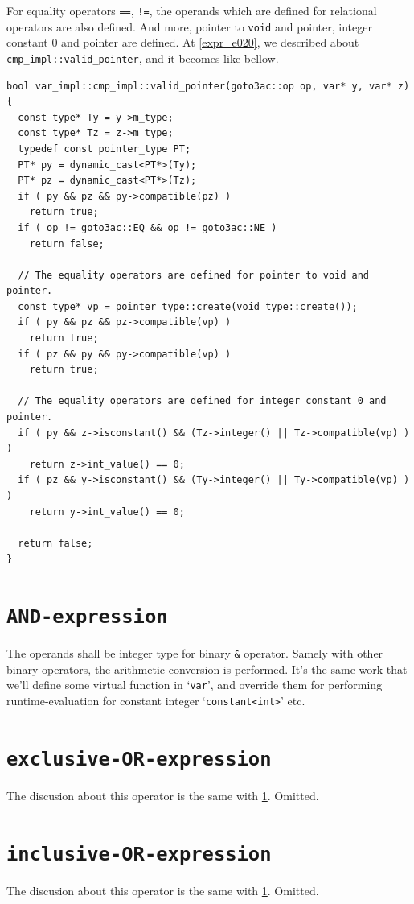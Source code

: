 For equality operators {\tt{==}}, {\tt{!=}}, 
the operands which are defined for relational operators
are also defined. And more,
pointer to {\tt{void}} and pointer,
integer constant 0 and pointer are defined.
At \ref{expr_e020}, we described
about {\tt{cmp\_impl::valid\_pointer}},
and it becomes like bellow.
\begin{verbatim}
bool var_impl::cmp_impl::valid_pointer(goto3ac::op op, var* y, var* z)
{
  const type* Ty = y->m_type;
  const type* Tz = z->m_type;
  typedef const pointer_type PT;
  PT* py = dynamic_cast<PT*>(Ty);
  PT* pz = dynamic_cast<PT*>(Tz);
  if ( py && pz && py->compatible(pz) )
    return true;
  if ( op != goto3ac::EQ && op != goto3ac::NE )
    return false;

  // The equality operators are defined for pointer to void and pointer.
  const type* vp = pointer_type::create(void_type::create());
  if ( py && pz && pz->compatible(vp) )
    return true;
  if ( pz && py && py->compatible(vp) )
    return true;

  // The equality operators are defined for integer constant 0 and pointer.
  if ( py && z->isconstant() && (Tz->integer() || Tz->compatible(vp) ) )
    return z->int_value() == 0;
  if ( pz && y->isconstant() && (Ty->integer() || Ty->compatible(vp) ) )
    return y->int_value() == 0;

  return false;
}
\end{verbatim}

\section{\tt{AND-expression}}
\label{expr_e021}
The operands shall be integer type for binary {\tt{\&}} operator.
Samely with other binary operators, the arithmetic conversion is
performed. It's the same work that we'll define some virtual function
in `{\tt{var}}', and override them for performing runtime-evaluation
for constant integer `{\tt{constant<int>}}' etc.

\section{\tt{exclusive-OR-expression}}
The discusion about this operator is the same with \ref{expr_e021}.
Omitted.

\section{\tt{inclusive-OR-expression}}
The discusion about this operator is the same with \ref{expr_e021}.
Omitted.

